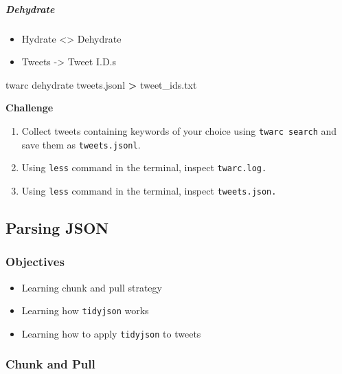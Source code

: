 \documentclass[
]{book}
\newenvironment{Shaded}{\begin{snugshade}}{\end{snugshade}}
\newcommand{\ExtensionTok}[1]{#1}
\newcommand{\NormalTok}[1]{#1}
\newcommand{\OperatorTok}[1]{\textcolor[rgb]{0.81,0.36,0.00}{\textbf{#1}}}
\providecommand{\tightlist}{%
  \setlength{\itemsep}{0pt}\setlength{\parskip}{0pt}}
\begin{document}
\subparagraph{Dehydrate}\label{dehydrate}

\begin{itemize}
\tightlist
\item
  Hydrate \textless\textgreater{} Dehydrate
\item
  Tweets -\textgreater{} Tweet I.D.s
\end{itemize}

\begin{Shaded}
\begin{Highlighting}[]
\ExtensionTok{twarc}\NormalTok{ dehydrate tweets.jsonl }\OperatorTok{\textgreater{}}\NormalTok{ tweet\_ids.txt}
\end{Highlighting}
\end{Shaded}

\textbf{Challenge}

\begin{enumerate}
\def\labelenumi{\arabic{enumi}.}
\item
  Collect tweets containing keywords of your choice using \texttt{twarc\ search} and save them as \texttt{tweets.jsonl}.
\item
  Using \texttt{less} command in the terminal, inspect \texttt{twarc.log.}
\item
  Using \texttt{less} command in the terminal, inspect \texttt{tweets.json.}
\end{enumerate}

\subsection{Parsing JSON}\label{parsing-json}

\subsubsection{Objectives}\label{objectives-6}

\begin{itemize}
\tightlist
\item
  Learning chunk and pull strategy
\item
  Learning how \texttt{tidyjson} works
\item
  Learning how to apply \texttt{tidyjson} to tweets
\end{itemize}

\subsubsection{Chunk and Pull}\label{chunk-and-pull}
\end{document}
